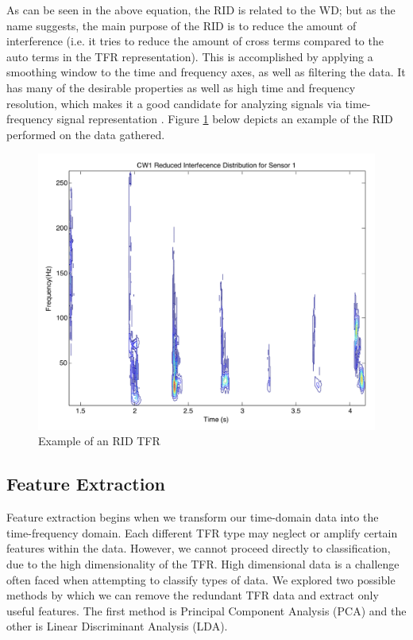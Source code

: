 \documentclass{article}[11pt]
\begin{document}
As can be seen in the above equation, the RID is related to the WD; but as the name suggests, the main purpose of the RID is to reduce the amount of interference (i.e. it tries to reduce the amount of cross terms compared to the auto terms in the TFR representation). This is accomplished by applying a smoothing window to the time and frequency axes, as well as filtering the data. It has many of the desirable properties as well as high time and frequency resolution, which makes it a good candidate for analyzing signals via time-frequency signal representation \cite{Jeong1992}. Figure \ref{fig:TFRRID} below depicts an example of the RID performed on the data gathered.

\begin{figure}[H]
\centering
\includegraphics[scale = 0.6]{Images/RID.pdf}
\caption{Example of an RID TFR}
\label{fig:TFRRID}
\end{figure}

\subsection{Feature Extraction}
\label{sec:featex}
Feature extraction begins when we transform our time-domain data into the time-frequency domain.  Each different TFR type may neglect or amplify certain features within the data.  However, we cannot proceed directly to classification, due to the high dimensionality of the TFR. High dimensional data is a challenge often faced when attempting to classify types of data. We explored two possible methods by which we can remove the redundant TFR data and extract only useful features.  The first method is Principal Component Analysis (PCA) and the other is Linear Discriminant Analysis (LDA).
\end{document}
